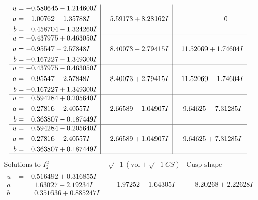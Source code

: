 \documentclass[1p]{elsarticle_modified}
\theoremstyle{definition}
\newcommand{\I}{\sqrt{-1}}
\begin{document}
$$\begin{array}{c|c|c}
\begin{aligned}
u &= -0.580645 - 1.214600 I \\
a &= \phantom{-}1.00762 + 1.35788 I \\
b &= \phantom{-}0.458704 - 1.324260 I\end{aligned}
 & \phantom{-}5.59173 + 8.28162 I & \phantom{-0.000000 } 0 \\ \hline\begin{aligned}
u &= -0.437975 + 0.463050 I \\
a &= -0.95547 + 2.57848 I \\
b &= -0.167227 - 1.349300 I\end{aligned}
 & \phantom{-}8.40073 - 2.79415 I & \phantom{-}11.52069 + 1.74604 I \\ \hline\begin{aligned}
u &= -0.437975 - 0.463050 I \\
a &= -0.95547 - 2.57848 I \\
b &= -0.167227 + 1.349300 I\end{aligned}
 & \phantom{-}8.40073 + 2.79415 I & \phantom{-}11.52069 - 1.74604 I \\ \hline\begin{aligned}
u &= \phantom{-}0.594284 + 0.205640 I \\
a &= -0.27816 + 2.40557 I \\
b &= \phantom{-}0.363807 - 0.187449 I\end{aligned}
 & \phantom{-}2.66589 - 1.04907 I & \phantom{-}9.64625 - 7.31285 I \\ \hline\begin{aligned}
u &= \phantom{-}0.594284 - 0.205640 I \\
a &= -0.27816 - 2.40557 I \\
b &= \phantom{-}0.363807 + 0.187449 I\end{aligned}
 & \phantom{-}2.66589 + 1.04907 I & \phantom{-}9.64625 + 7.31285 I\\
 \hline 
 \end{array}$$\newpage$$\begin{array}{c|c|c}  
\text{Solutions to }I^u_{2}& \I (\text{vol} + \sqrt{-1}CS) & \text{Cusp shape}\\
 \hline 
\begin{aligned}
u &= -0.516492 + 0.316855 I \\
a &= \phantom{-}1.63027 - 2.19234 I \\
b &= \phantom{-}0.351636 + 0.885247 I\end{aligned}
 & \phantom{-}1.97252 - 1.64305 I & \phantom{-}8.20268 + 2.22628 I \\ \hline\begin{aligned}

\end{aligned}
\end{array}$$
\end{document}
